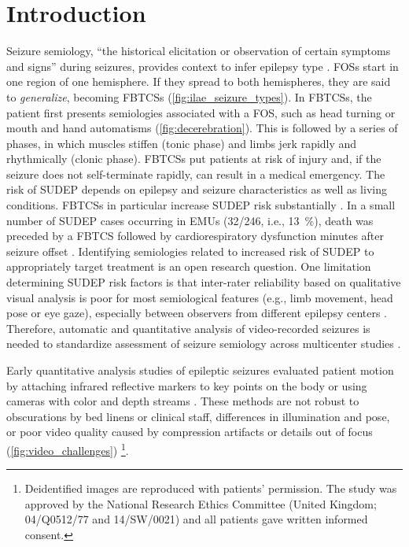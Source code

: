 \section{Introduction}



Seizure semiology, ``the historical elicitation or observation of certain symptoms and signs'' during seizures, provides context to infer epilepsy type \cite{fisher_operational_2017}.
\Acp{FOS} start in one region of one hemisphere.
If they spread to both hemispheres, they are said to \emph{generalize}, becoming \acp{FBTCS} \cite{fisher_operational_2017} (\cref{fig:ilae_seizure_types}).
In \acp{FBTCS}, the patient first presents semiologies associated with a \ac{FOS}, such as head turning or mouth and hand automatisms (\cref{fig:decerebration}).
This is followed by a series of phases, in which muscles stiffen (tonic phase) and limbs jerk rapidly and rhythmically (clonic phase).
\Acp{FBTCS} put patients at risk of injury and, if the seizure does not self-terminate rapidly, can result in a medical emergency.
The risk of \ac{SUDEP} depends on epilepsy and seizure characteristics as well as living conditions.
\Acp{FBTCS} in particular increase \ac{SUDEP} risk substantially \cite{nashef_unifying_2012}.
In a small number of \ac{SUDEP} cases occurring in \acp{EMU} (32/246, i.e., 13~\%), death was preceded by a \ac{FBTCS} followed by cardiorespiratory dysfunction minutes after seizure offset \cite{ryvlin_incidence_2013}.
Identifying semiologies related to increased risk of \ac{SUDEP} to appropriately target treatment is an open research question.
One limitation determining \ac{SUDEP} risk factors is that inter-rater reliability based on qualitative visual analysis is poor for most semiological features (e.g., limb movement, head pose or eye gaze), especially between observers from different epilepsy centers \cite{tufenkjian_seizure_2012}.
Therefore, automatic and quantitative analysis of video-recorded seizures is needed to standardize assessment of seizure semiology across multicenter studies \cite{ahmedtaristizabal_automated_2017}.




Early quantitative analysis studies of epileptic seizures evaluated patient motion by attaching infrared reflective markers to key points on the body or using cameras with color and depth streams \cite{li_z_movement_2002,cunha_movement_2003,odwyer_lateralizing_2007,cunha_neurokinect_2016}.
These methods are not robust to obscurations by bed linens or clinical staff, differences in illumination and pose, or poor video quality caused by compression artifacts or details out of focus (\cref{fig:video_challenges})%
\footnote{Deidentified images are reproduced with patients' permission. The study was approved by the National Research Ethics Committee (United Kingdom; 04/Q0512/77 and 14/SW/0021) and all patients gave written informed consent.}.

